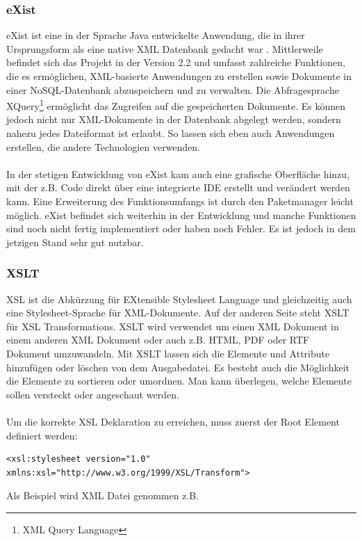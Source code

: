 \subsubsection{eXist}
\label{subsec:eXist}
eXist \cite{existwebsite} ist eine in der Sprache Java entwickelte Anwendung, die in ihrer Ursprungsform als eine native XML Datenbank gedacht war \cite{siegel:exist}. Mittlerweile befindet sich das Projekt in der Version 2.2 und umfasst zahlreiche Funktionen, die es ermöglichen, XML-basierte Anwendungen zu erstellen sowie Dokumente in einer NoSQL-Datenbank abzuspeichern und zu verwalten. Die Abfragesprache XQuery\footnote[1]{XML Query Language} ermöglicht das Zugreifen auf die gespeicherten Dokumente. Es können jedoch nicht nur XML-Dokumente in der Datenbank abgelegt werden, sondern nahezu jedes Dateiformat ist erlaubt. So lassen sich eben auch Anwendungen erstellen, die andere Technologien verwenden.
\\
\\
In der stetigen Entwicklung von eXist kam auch eine grafische Oberfläche hinzu, mit der z.B. Code direkt über eine integrierte IDE erstellt und verändert werden kann. Eine Erweiterung des Funktionsumfangs ist durch den Paketmanager leicht möglich. eXist befindet sich weiterhin in der Entwicklung und manche Funktionen sind noch nicht fertig implementiert oder haben noch Fehler. Es ist jedoch in dem jetzigen Stand sehr gut nutzbar.

\subsubsection{XSLT}
\label{subsec:XSLT}
XSL ist die Abkürzung für EXtensible Stylesheet Language und gleichzeitig auch eine Stylesheet-Sprache für XML-Dokumente. Auf der anderen Seite steht XSLT \cite{xsltwebsite} für XSL Transformations. XSLT wird verwendet um einen XML Dokument in einem anderen XML Dokument oder auch z.B. HTML, PDF oder RTF Dokument umzuwandeln. Mit XSLT lassen sich die Elemente und Attribute hinzufügen oder löschen von dem Ausgabedatei. Es besteht auch die Möglichkeit die Elemente zu sortieren oder umordnen. Man kann überlegen, welche Elemente sollen versteckt oder angeschaut werden.
\\
\\
Um die korrekte XSL Deklaration zu erreichen, muss zuerst der Root Element definiert werden:  
\begin{lstlisting}
<xsl:stylesheet version="1.0"
xmlns:xsl="http://www.w3.org/1999/XSL/Transform">
\end{lstlisting}
Als Beispiel wird XML Datei genommen z.B.

